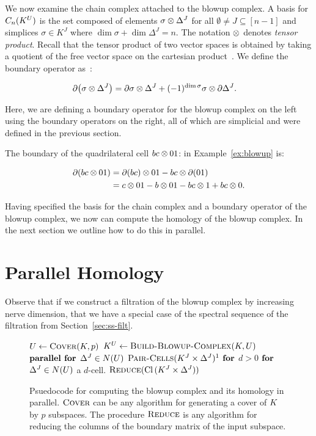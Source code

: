 We now examine the chain complex attached to the blowup complex.
A basis for $C_n(K^U)$ is the set composed of elements 
$\sigma \otimes \Delta^J$ for all $\emptyset \not = J \subseteq [n-1]$ and 
simplices $\sigma \in K^J$ where $\dim{\sigma} + \dim{\Delta^J} = n$.  The notation
$\otimes$ denotes \emph{tensor product}. Recall that the tensor product of two 
vector spaces is obtained by taking a quotient of the free vector space
on the cartesian product~\cite[\textrm{Page }218]{hatcher}.
We define the boundary operator as~\cite[\textrm{Lemma }4]{zc-lh-08}:
\begin{linenomath*}
\begin{align*}
\partial{\left (\sigma \otimes\Delta^J \right)}
&=
\partial{\sigma} \otimes \Delta^J + 
(-1)^{\dim{\sigma}}\sigma \otimes \partial\Delta^J.
\end{align*}
\end{linenomath*}
Here, we are defining a boundary operator for the blowup complex on the left 
using the boundary operators on the right, all of which are simplicial and were 
defined in the previous section. 
\begin{example}
The boundary of the quadrilateral cell 
$bc \otimes 01$: in Example~\ref{ex:blowup} is:
\begin{linenomath*}
\begin{align*}
\partial{\left (bc \otimes01 \right)}
&=
\partial{(bc)} \otimes 01 - bc \otimes \partial(01) \\
&= c \otimes 01 - b \otimes 01 - bc \otimes 1 + bc \otimes 0.
\end{align*}
\end{linenomath*}
\end{example}
Having specified the basis for the chain complex and a boundary operator of 
the blowup complex, we now can compute the homology of the blowup complex. In the next section we
outline how to do this in parallel.

\section{Parallel Homology}
Observe that if we construct a filtration of the blowup complex by increasing nerve dimension, that we have a special case of the spectral sequence of the filtration from Section~\ref{sec:ss-filt}. 

\begin{figure}
\centering
\begin{codebox}
 \li  $U \gets \textnormal{\scshape Cover}(K, p)$
 \li  $K^{U} \gets \textnormal{\scshape Build-Blowup-Complex}(K, U)$
 \li  $\textbf{parallel for}$   $\Delta^J \in N(U)$
 \li  \Do $\proc{Pair-Cells}(\K^{J} \times \Delta^{J})\footnotemark$
      \End
\li $\textbf{for}$ $d > 0$
 \li \Do $\textbf{for}$ $\Delta^J \in N(U)$ a $d$-cell.
 \li  \Do $\textnormal{\scshape Reduce}(\operatorname{Cl}{(K^{J} \times \Delta^{J})})$ 
\end{codebox}
\caption{Psuedocode for computing the blowup complex and its homology in parallel. $\textnormal{\scshape Cover}$ can be any algorithm for generating a cover of $K$ by $p$ subspaces. The procedure $\textnormal{\scshape Reduce}$ is any algorithm for reducing the columns of the boundary matrix of the input subspace.}
\label{fig:multicore-code}
\end{figure}

